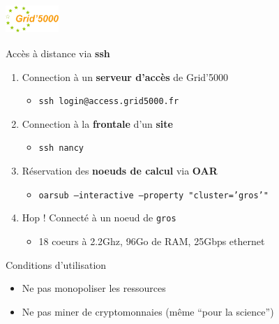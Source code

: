 \documentclass[10pt]{beamer}
\begin{document}

\begin{frame}[label=tme]
  \frametitle{\includegraphics[height=1cm]{grid5000_logo.png}}

  \begin{block}{Accès à distance via \textbf{ssh}}
    \begin{enumerate}
    \item Connection à un \textbf{serveur d'accès} de Grid'5000
      \begin{itemize}
      \item \texttt{ssh login@access.grid5000.fr}
      \end{itemize}

      \smallskip
      
    \item Connection à la \textbf{frontale} d'un \textbf{site}
      \begin{itemize}
      \item \texttt{ssh nancy}
      \end{itemize}

      \smallskip
      
    \item Réservation des \textbf{noeuds de calcul} via \textbf{OAR}
      \begin{itemize}
      \item \texttt{oarsub --interactive --property "cluster='gros'"}
      \end{itemize}

      \smallskip
      
    \item Hop ! Connecté à un noeud de \texttt{gros}
      \begin{itemize}
      \item 18 coeurs à 2.2Ghz, 96Go de RAM, 25Gbps ethernet
      \end{itemize}
    \end{enumerate}
  \end{block}

  \begin{alertblock}{Conditions d'utilisation}
    \begin{itemize}
    \item Ne pas monopoliser les ressources
    \item Ne pas miner de cryptomonnaies (même ``pour la science'')
    \end{itemize}
  \end{alertblock}
\end{frame}
\end{document}
